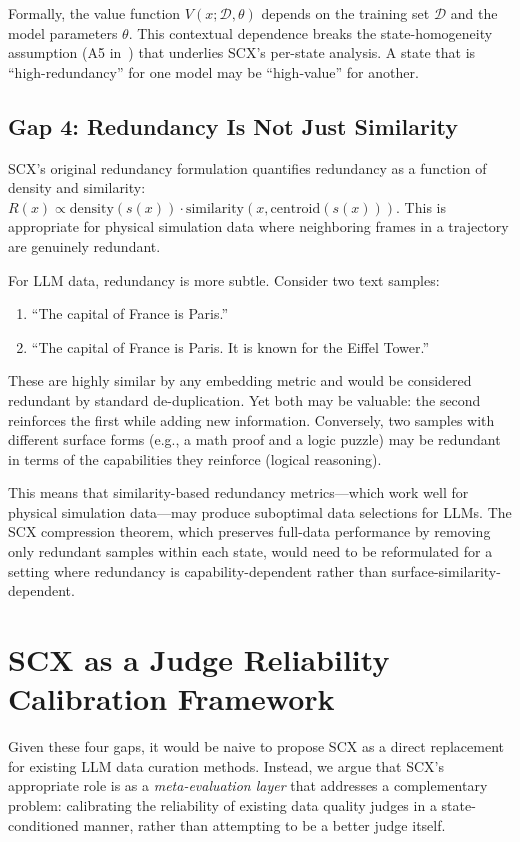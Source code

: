 \documentclass[11pt,twocolumn]{article}
\begin{document}
Formally, the value function $V(x; \mathcal{D}, \theta)$ depends on the training set $\mathcal{D}$ and the model parameters $\theta$. This contextual dependence breaks the state-homogeneity assumption (A5 in~\cite{scx2026}) that underlies SCX's per-state analysis. A state that is ``high-redundancy'' for one model may be ``high-value'' for another.

\subsection{Gap 4: Redundancy Is Not Just Similarity}

SCX's original redundancy formulation quantifies redundancy as a function of density and similarity: $R(x) \propto \text{density}(s(x)) \cdot \text{similarity}(x, \text{centroid}(s(x)))$. This is appropriate for physical simulation data where neighboring frames in a trajectory are genuinely redundant.

For LLM data, redundancy is more subtle. Consider two text samples:
\begin{enumerate}
    \item ``The capital of France is Paris.''
    \item ``The capital of France is Paris. It is known for the Eiffel Tower.''
\end{enumerate}
These are highly similar by any embedding metric and would be considered redundant by standard de-duplication. Yet both may be valuable: the second reinforces the first while adding new information. Conversely, two samples with different surface forms (e.g., a math proof and a logic puzzle) may be redundant in terms of the capabilities they reinforce (logical reasoning).

This means that similarity-based redundancy metrics---which work well for physical simulation data---may produce suboptimal data selections for LLMs. The SCX compression theorem, which preserves full-data performance by removing only redundant samples within each state, would need to be reformulated for a setting where redundancy is capability-dependent rather than surface-similarity-dependent.

\section{SCX as a Judge Reliability Calibration Framework}

Given these four gaps, it would be naive to propose SCX as a direct replacement for existing LLM data curation methods. Instead, we argue that SCX's appropriate role is as a \textit{meta-evaluation layer} that addresses a complementary problem: calibrating the reliability of existing data quality judges in a state-conditioned manner, rather than attempting to be a better judge itself.
\end{document}
